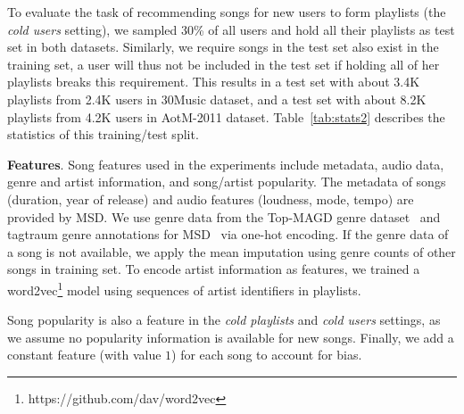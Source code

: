 To evaluate the task of recommending songs for new users to form playlists (\ie the \emph{cold users} setting),
we sampled 30\% of all users and hold all their playlists as test set in both datasets.
Similarly, we require songs in the test set also exist in the training set,
a user will thus not be included in the test set if holding all of her playlists breaks this requirement.
This results in a test set with about 3.4K playlists from 2.4K users in 30Music dataset,
and a test set with about 8.2K playlists from 4.2K users in AotM-2011 dataset.
Table~\ref{tab:stats2} describes the statistics of this training/test split.


{\bf Features}.
Song features used in the experiments include metadata, audio data, genre and artist information, and song/artist popularity.
%
The metadata of songs (\eg duration, year of release) and audio features (\eg loudness, mode, tempo) are provided by MSD.
We use genre data from the Top-MAGD genre dataset~\cite{schindler2012facilitating}
and tagtraum genre annotations for MSD~\cite{schreiber2015improving} via one-hot encoding.
If the genre data of a song is not available, we apply the mean imputation using genre counts of other songs in training set.
To encode artist information as features,
we trained a word2vec\footnote{https://github.com/dav/word2vec} model using sequences of artist identifiers in playlists.

Song popularity is also a feature in the \emph{cold playlists} and \emph{cold users} settings, as we assume no popularity information 
is available for new songs.
Finally, we add a constant feature (with value $1$) for each song to account for bias.


